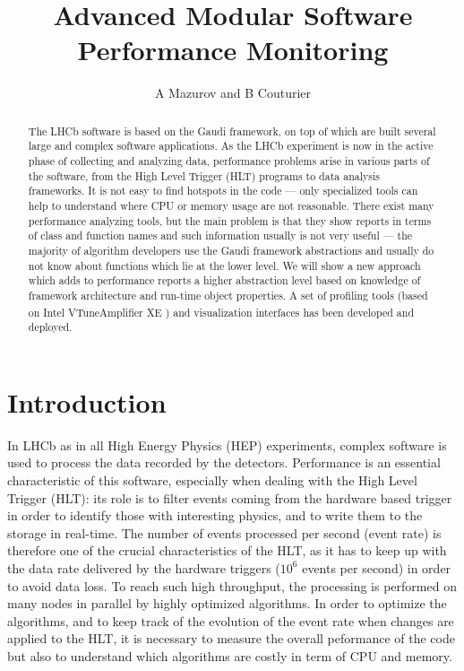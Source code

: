 \documentclass[a4paper]{jpconf}
\begin{document}
\linenumbers
\title{Advanced Modular Software Performance Monitoring}
\author{A Mazurov and B Couturier}

\address{ CERN, European Organization for Nuclear Research, Geneva, Switzerland}
\address{ University of Ferrara, Ferrara, Italy}
\address{ Institute for Nuclear Research, Troitsk, Russia}




\newcommand\iamp{{Intel\textsuperscript{\textregistered} VTune\texttrademark Amplifier XE} }
\newcommand\amp{{VTune\texttrademark Amplifier XE} }
\newcommand\intel{{Intel\textsuperscript{\textregistered}} }

\begin{abstract}
The LHCb software is based on the Gaudi framework, on top of which are built several large and complex software 
applications. As the LHCb experiment is now in the active phase of collecting and analyzing data, performance problems 
arise in various parts of the software, from the High Level Trigger (HLT) programs to data analysis frameworks. 
It is not easy to find hotspots in the code --- only specialized tools can help to understand where CPU or memory usage 
are not reasonable. There exist many performance analyzing tools, but the main problem is that they show reports in 
terms of class and function names and such information usually is not very useful --- the majority of algorithm 
developers use the Gaudi framework abstractions and usually do not know about functions which lie at the lower level. 
We will show a new approach which adds to performance reports a higher abstraction level based on knowledge of 
framework architecture and run-time object properties. A set of profiling tools (based on \iamp) and visualization 
interfaces has been developed and deployed.
\end{abstract}

\section{Introduction}
In LHCb as in all High Energy Physics (HEP) experiments, complex software is used to process the data recorded 
by the detectors. Performance is an essential characteristic of this software, especially when dealing with 
the High Level Trigger (HLT): its role is to filter events coming from the hardware based trigger in order to identify 
those with interesting physics, and to write them to the storage in real-time. The number of events processed per 
second (event rate) is therefore one of the crucial characteristics of the HLT, as it has to keep up with the data rate 
delivered by the hardware triggers ($10^6$ events per second) in order to avoid data loss. To reach such high 
throughput, the processing is performed on many nodes in parallel by highly optimized algorithms. In order to optimize 
the algorithms, and to keep track of the evolution of the event rate when changes are applied to the HLT, it is 
necessary to measure the overall peformance of the code but also to understand which algorithms are costly in term of 
CPU and memory.
\end{document}

